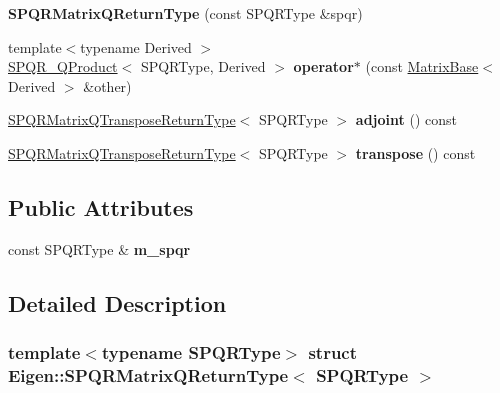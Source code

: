 \begin{DoxyCompactItemize}
{\bfseries S\+P\+Q\+R\+Matrix\+Q\+Return\+Type} (const S\+P\+Q\+R\+Type \&spqr)
\item 
\mbox{\label{struct_eigen_1_1_s_p_q_r_matrix_q_return_type_a3ee436fdb285df3bf4cc13c93fc84048}} 
{\footnotesize template$<$typename Derived $>$ }\\\hyperlink{struct_eigen_1_1_s_p_q_r___q_product}{S\+P\+Q\+R\+\_\+\+Q\+Product}$<$ S\+P\+Q\+R\+Type, Derived $>$ {\bfseries operator$\ast$} (const \hyperlink{group___core___module_class_eigen_1_1_matrix_base}{Matrix\+Base}$<$ Derived $>$ \&other)
\item 
\mbox{\label{struct_eigen_1_1_s_p_q_r_matrix_q_return_type_a0465ee73e6f6740738db4b3aff2995de}} 
\hyperlink{struct_eigen_1_1_s_p_q_r_matrix_q_transpose_return_type}{S\+P\+Q\+R\+Matrix\+Q\+Transpose\+Return\+Type}$<$ S\+P\+Q\+R\+Type $>$ {\bfseries adjoint} () const
\item 
\mbox{\label{struct_eigen_1_1_s_p_q_r_matrix_q_return_type_a36141444649f6a785875777f8af9b366}} 
\hyperlink{struct_eigen_1_1_s_p_q_r_matrix_q_transpose_return_type}{S\+P\+Q\+R\+Matrix\+Q\+Transpose\+Return\+Type}$<$ S\+P\+Q\+R\+Type $>$ {\bfseries transpose} () const
\end{DoxyCompactItemize}
\subsection*{Public Attributes}
\begin{DoxyCompactItemize}
\item 
\mbox{\label{struct_eigen_1_1_s_p_q_r_matrix_q_return_type_a675f4c84873f17fa732b891b14711b19}} 
const S\+P\+Q\+R\+Type \& {\bfseries m\+\_\+spqr}
\end{DoxyCompactItemize}


\subsection{Detailed Description}
\subsubsection*{template$<$typename S\+P\+Q\+R\+Type$>$\newline
struct Eigen\+::\+S\+P\+Q\+R\+Matrix\+Q\+Return\+Type$<$ S\+P\+Q\+R\+Type $>$}



